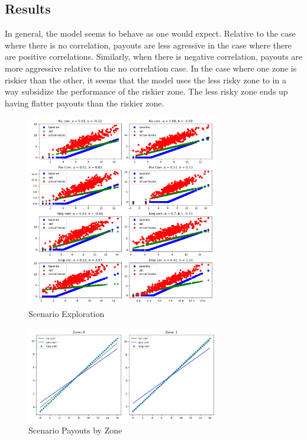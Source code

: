 \documentclass[11pt]{article}
\begin{document}
\subsection*{Results}
In general, the model seems to behave as one would expect. Relative to the case where there is no correlation, payouts are less agressive in the case where there are positive correlations. Similarly, when there is negative correlation, payouts are more aggressive relative to the no correlation case. In the case where one zone is riskier than the other, it seems that the model uses the less risky zone to in a way subsidize the performance of the riskier zone. The less risky zone ends up having flatter payouts than the riskier zone. 
\begin{figure}[H]
    \centering
    \caption{Scenario Exploration}
    \includegraphics[width=0.75\textwidth]{../../output/figures/Exploration/scenario_exploration.png}
\end{figure}

\begin{figure}[H]
    \centering
    \caption{Scenario Payouts by Zone}
    \includegraphics[width=0.75\textwidth]{../../output/figures/Exploration/scenario_payouts_by_zone.png}
\end{figure}
\end{document}

